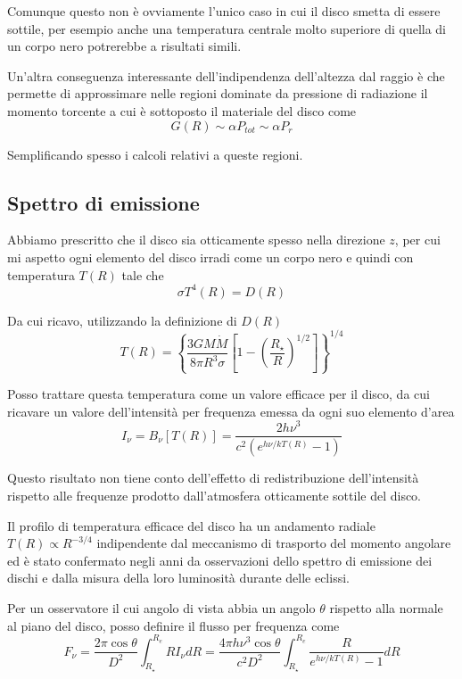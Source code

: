 \documentclass[a4paperbi]{article}
\begin{document}
	Comunque questo non è ovviamente l'unico caso in cui il disco smetta di essere sottile, per esempio anche una temperatura centrale molto superiore di quella di un corpo nero potrerebbe a risultati simili.
	
	Un'altra conseguenza interessante dell'indipendenza dell'altezza dal raggio è che permette di approssimare nelle regioni dominate da pressione di radiazione il momento torcente a cui è sottoposto il materiale del disco come
	\begin{equation}
		G(R)\sim\alpha P_{tot}\sim\alpha P_r
	\end{equation}
	
	Semplificando spesso i calcoli relativi a queste regioni.
	
\subsection{Spettro di emissione}
	Abbiamo prescritto che il disco sia otticamente spesso nella direzione $z$, per cui mi aspetto ogni elemento del disco irradi come un corpo nero e quindi con temperatura $T(R)$ tale che
	\begin{equation}
		\sigma T^4(R)=D(R)
	\end{equation}
	
	Da cui ricavo, utilizzando la definizione di $D(R)$
	\begin{equation}
		T(R)=\left\{\frac{3GM\dot{M}}{8\pi R^3\sigma}\left[1-\left(\frac{R_{\star}}{R}\right)^{1/2}\right]\right\}^{1/4}
	\end{equation}
	
	Posso trattare questa temperatura come un valore efficace per il disco, da cui ricavare un valore dell'intensità per frequenza emessa da ogni suo elemento d'area
	\begin{equation}
		I_\nu=B_\nu[T(R)]=\frac{2h\nu^3}{c^2(e^{h\nu/kT(R)}-1)}
	\end{equation}
	
	Questo risultato non tiene conto dell'effetto di redistribuzione dell'intensità rispetto alle frequenze prodotto dall'atmosfera otticamente sottile del disco.

	Il profilo di temperatura efficace del disco ha un andamento radiale $T(R)\propto R^{-3/4}$ indipendente dal meccanismo di trasporto del momento angolare ed è stato confermato negli anni da osservazioni dello spettro di emissione dei dischi e dalla misura della loro luminosità durante delle eclissi.
	
	Per un osservatore il cui angolo di vista abbia un angolo $\theta$ rispetto alla normale al piano del disco, posso definire il flusso per frequenza come
	\begin{equation}
		F_\nu=\frac{2\pi \cos{\theta}}{D^2}\int^{R_{e}}_{R_{\star}}RI_\nu dR=\frac{4\pi h\nu^3\cos{\theta}}{c^2D^2}\int^{R_{e}}_{R_{\star}}\frac{R}{e^{h\nu/kT(R)}-1}dR
	\end{equation}
	
\end{document}
